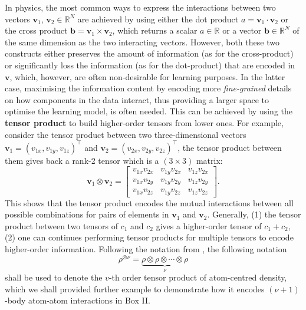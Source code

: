 \begin{myquote}
\hspace{10pt} In physics, the most common ways to express the interactions between two vectors $\bm{v}_1$, $\bm{v}_2\in\mathbb{R}^N$ are achieved by using either the dot product $a=\bm{v}_1\cdot\bm{v}_2$ or the cross product $\bm{b}=\bm{v}_1\times\bm{v}_2$, which returns a scalar $a\in\mathbb{R}$ or a vector $\bm{b}\in\mathbb{R}^{N}$ of the same dimension as the two interacting vectors. However, both these two constructs either preserves the amount of information (as for the cross-product) or significantly loss the information (as for the dot-product) that are encoded in $\bm{v}$, which, however, are often  non-desirable for learning purposes. In the latter case, maximising the information content by encoding more \emph{fine-grained} details on how components in the data interact, thus providing a larger  space to optimise the learning model, is often needed. This can be achieved by using the \textbf{tensor product} to build higher-order tensors from lower ones. For example, consider the tensor product between two three-dimensional vectors $\bm{v}_1=(v_{1x},v_{1y},v_{1z})^\top$ and $\bm{v}_2=(v_{2x},v_{2y},v_{2z})^\top$, the tensor product between them gives back a rank-2 tensor which is a $(3\times3)$ matrix:
\begin{equation}
   \label{eq:tensor_product_two_vector_3D} \bm{v}_1\otimes\bm{v}_2=\left[\begin{array}{ccc}
        v_{1x}v_{2x} & v_{1y}v_{2x} & v_{1z}v_{2x} \\
        v_{1x}v_{2y} & v_{1y}v_{2y} & v_{1z}v_{2y} \\
        v_{1x}v_{2z} & v_{1y}v_{2z} & v_{1z}v_{2z}
    \end{array}\right].
\end{equation}
This shows that the tensor product encodes the mutual interactions between all possible combinations for pairs of elements in $\bm{v}_1$ and $\bm{v}_2$. Generally, (1) the tensor product between two tensors of $c_1$ and $c_2$ gives a higher-order tensor of $c_1+c_2$, (2) one can continues performing tensor products for multiple tensors to encode higher-order information. Following the notation from \citet{willatt2019atom}, the following notation
\begin{equation}
    \label{eq:density_tensor_prod_v}
    \rho^{\otimes \nu} = \underbrace{\rho\otimes\rho\otimes\cdots\otimes\rho}_{\nu}
\end{equation}
shall be used to denote the $v$-th order tensor product of atom-centred density, which we shall provided further example to demonstrate how it encodes $(\nu+1)$-body atom-atom interactions in Box II. 


\end{myquote}
